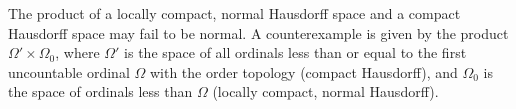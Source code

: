 The product of a locally compact, normal Hausdorff space and a compact Hausdorff space may fail to be normal. A counterexample is given by the product $\Omega' \times \Omega_0$, where $\Omega'$ is the space of all ordinals less than or equal to the first uncountable ordinal $\Omega$ with the order topology (compact Hausdorff), and $\Omega_0$ is the space of ordinals less than $\Omega$ (locally compact, normal Hausdorff).
